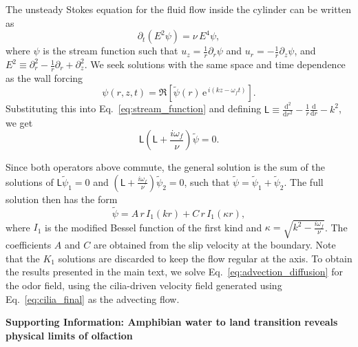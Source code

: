 \documentclass[%
 twocolumn,
 amsmath,amssymb,
 aps,prfluids,
 superscriptaddress,
]{revtex4-2}
\begin{document}
The unsteady Stokes equation for the fluid flow inside the cylinder can be written as~\cite{happel2012low}
\begin{equation}
    \partial_t\!\left(E^2\psi\right)=\nu\,E^4\psi,
    \label{eq:stream_function}
\end{equation}
where $\psi$ is the stream function such that $u_z = \frac{1}{r}\partial_r\psi$ and $u_r = -\frac{1}{r}\partial_z\psi$, and $E^2\equiv\partial_r^2-\frac1r\partial_r+\partial_z^2$. We seek solutions with the same space and time dependence as the wall forcing
\begin{equation}
\psi(r,z,t)=\Re\left[\tilde\psi(r)\,\mathrm{e}^{\,i(kz-\omega_f t)}\right].
\label{eq:psi_solution}
\end{equation}
Substituting this into Eq.~\eqref{eq:stream_function} and defining
$\mathsf{L}\equiv\frac{\mathrm{d}^2}{\mathrm{d} r^2}-\frac1r\frac{\mathrm{d}}{\mathrm{d} r}-k^2$, we get
\begin{equation}
    \mathsf{L}\left(\mathsf{L}+\frac{i\omega_f}{\nu}\right)\tilde\psi = 0.
    \label{eq:stream_function_final}
\end{equation}

Since both operators above commute, the general solution is the sum of the solutions of $\mathsf{L}\tilde\psi_1 = 0$ and $\left(\mathsf{L}+\frac{i\omega_f}{\nu}\right)\tilde\psi_2 = 0$, such that $\tilde\psi = \tilde\psi_1+\tilde\psi_2$. The full solution then has the form
\begin{equation}
    \tilde\psi = A\, r\,I_1(kr)+C\,r\,I_1(\kappa r),
    \label{eq:cilia_final}
\end{equation}
where $I_1$ is the modified Bessel function of the first kind and $\kappa = \sqrt{k^2-\frac{i\omega_f}{\nu}}$. The coefficients $A$ and $C$ are obtained from the slip velocity at the boundary. Note that the $K_1$ solutions are discarded to keep the flow regular at the axis. To obtain the results presented in the main text, we solve Eq.~\eqref{eq:advection_diffusion} for the odor field, using the cilia-driven velocity field generated using Eq.~\eqref{eq:cilia_final} as the advecting flow.  



\clearpage
\pagebreak

\widetext
\begin{center}
\textbf{\large Supporting Information: Amphibian water to land transition reveals physical limits of olfaction}
\end{center}
\setcounter{equation}{0}
\setcounter{figure}{0}
\setcounter{table}{0}
\setcounter{section}{0}
\makeatletter
\renewcommand{\theequation}{S\arabic{equation}}
\renewcommand{\thefigure}{S\arabic{figure}}
\renewcommand{\thetable}{S\arabic{table}}
\end{document}
